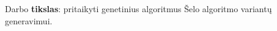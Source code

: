 \documentclass{VUMIFInfKursinis}
\begin{document}



Darbo \textbf{tikslas}:
pritaikyti genetinius algoritmus Šelo algoritmo variantų generavimui.
\end{document}
